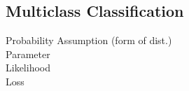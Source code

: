 \documentclass{article}
\begin{document}
\subsection{Multiclass Classification}
Probability Assumption (form of dist.)
\\
Parameter 
\\
Likelihood
\\
Loss
\end{document}
